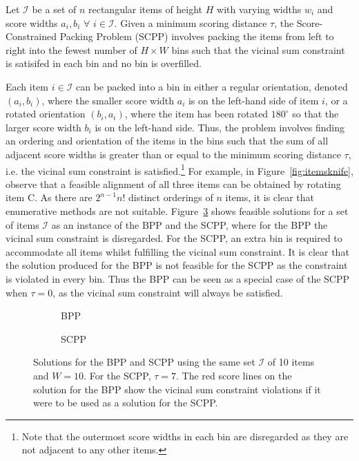\documentclass[authoryear]{elsarticle}
\begin{document}
\begin{definition}
	Let $\mathcal{I}$ be a set of $n$ rectangular items of height $H$ with varying widths $w_i$ and score widths $a_i, b_i$ $\forall$ $i \in \mathcal{I}$. Given a minimum scoring distance $\tau$, the Score-Constrained Packing Problem (SCPP) involves packing the items from left to right into the fewest number of $H \times W$ bins such that the vicinal sum constraint is satisifed in each bin and no bin is overfilled.
	\label{defn:scsp}
\end{definition}	

\noindent Each item $i \in \mathcal{I}$ can be packed into a bin in either a regular orientation, denoted $(a_i, b_i)$, where the smaller score width $a_i$ is on the left-hand side of item $i$, or a rotated orientation $(b_i, a_i)$, where the item has been rotated $180^{\circ}$ so that the larger score width $b_i$ is on the left-hand side. Thus, the problem involves finding an ordering and orientation of the items in the bins such that the sum of all adjacent score widths is greater than or equal to the minimum scoring distance $\tau$, i.e. the vicinal sum constraint is satisfied.\footnote{Note that the outermost score widths in each bin are disregarded as they are not adjacent to any other items.} For example, in Figure~\ref{fig:itemsknife}, observe that a feasible alignment of all three items can be obtained by rotating item C. As there are $2^{n-1} n!$ distinct orderings of $n$ items, it is clear that enumerative methods are not suitable. Figure~\ref{fig:bppvscpp} shows feasible solutions for a set of items $\mathcal{I}$ as an instance of the BPP and the SCPP, where for the BPP the vicinal sum constraint is disregarded. For the SCPP, an extra bin is required to accommodate all items whilst fulfilling the vicinal sum constraint. It is clear that the solution produced for the BPP is not feasible for the SCPP as the constraint is violated in every bin. Thus the BPP can be seen as a special case of the SCPP when $\tau=0$, as the vicinal sum constraint will always be satisfied.
\begin{figure}[H]
	\centering	
	\begin{subfigure}[h]{0.27\textwidth}
		
		\caption{BPP}
		\label{fig:bpp}
	\end{subfigure} \hspace{20mm}
	\begin{subfigure}[h]{0.27\textwidth}
		
		\caption{SCPP}
		\label{fig:scpp}
	\end{subfigure}
	\caption{Solutions for the BPP and SCPP using the same set $\mathcal{I}$ of 10 items and $W = 10$. For the SCPP, $\tau = 7$. The red score lines on the solution for the BPP show the vicinal sum constraint violations if it were to be used as a solution for the SCPP.}	
	\label{fig:bppvscpp}
\end{figure}
\end{document}
